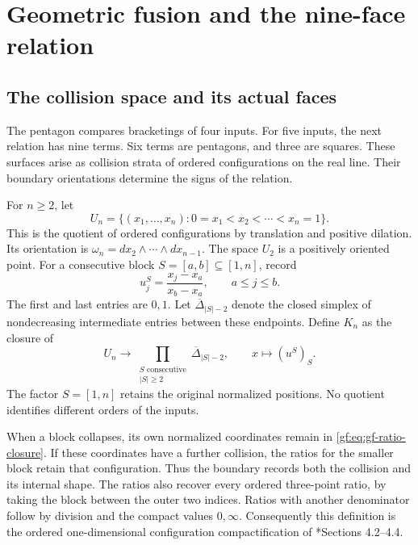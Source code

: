 \section{Geometric fusion and the nine-face relation}
\label{sec:geometric-fusion}

\subsection{The collision space and its actual faces}
\label{gf:sec:gf-space}

The pentagon compares bracketings of four inputs.  For five inputs,
the next relation has nine terms.  Six terms are pentagons, and three
are squares.  These surfaces arise as collision strata of ordered
configurations on the real line.  Their boundary orientations determine
the signs of the relation.

For \(n\geq2\), let
\[
 U_n=\{(x_1,\ldots,x_n):0=x_1<x_2<\cdots<x_n=1\}.
\]
This is the quotient of ordered configurations by translation and
positive dilation.  Its orientation is
\(\omega_n=dx_2\wedge\cdots\wedge dx_{n-1}\).
The space \(U_2\) is a positively oriented point.
For a consecutive block \(S=[a,b]\subseteq[1,n]\), record
\[
 u^S_j=\frac{x_j-x_a}{x_b-x_a},\qquad a\leq j\leq b.
\]
The first and last entries are \(0,1\).
Let \(\overline\Delta_{|S|-2}\) denote the closed simplex of
nondecreasing intermediate entries between these endpoints.
Define \(K_n\) as the closure of
\begin{equation}\label{gf:eq:gf-ratio-closure}
 U_n\longrightarrow
 \prod_{\substack{S\text{ consecutive}\\|S|\geq2}}
        \overline\Delta_{|S|-2},\qquad
 x\longmapsto(u^S)_S.
\end{equation}
The factor \(S=[1,n]\) retains the original normalized positions.
No quotient identifies different orders of the inputs.

When a block collapses, its own normalized coordinates remain in
\eqref{gf:eq:gf-ratio-closure}.  If these coordinates have a further
collision, the ratios for the smaller block retain that configuration.
Thus the boundary records both the collision and its internal shape.
The ratios also recover every ordered three-point ratio, by taking
the block between the outer two indices.  Ratios with another denominator
follow by division and the compact values \(0,\infty\).
Consequently this definition is the ordered one-dimensional
configuration compactification of \cite{GF-Sinha}*{Sections 4.2--4.4}.

